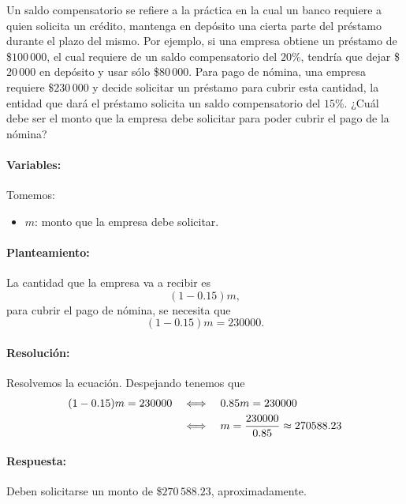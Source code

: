 \documentclass[10pt,respuestas,a4]{aleph-examen}
\begin{document}
\begin{preguntas}
\item
    Un saldo compensatorio se refiere a la práctica en la cual un banco requiere a quien solicita un crédito, mantenga en depósito una cierta parte del préstamo durante el plazo del mismo. Por ejemplo, si una empresa obtiene un préstamo de \$$100\,000$, el cual requiere de un saldo compensatorio del $20$\%, tendría que dejar \$$20\,000$ en depósito y usar sólo \$$80\,000$. Para pago de nómina, una empresa requiere \$$230\,000$ y decide solicitar un préstamo para cubrir esta cantidad, la entidad que dará el préstamo solicita un saldo compensatorio del $15$\%. ¿Cuál debe ser el monto que la empresa debe solicitar para poder cubrir el pago de la nómina?
    
\begin{respuesta}\hspace{0pt}
    \paragraph{Variables:} Tomemos:
    \begin{itemize}
        \item $m$: monto que la empresa debe solicitar.
    \end{itemize}
    \paragraph{Planteamiento:} La cantidad que la empresa va a recibir es
    \[
        (1 - 0.15)m,
    \]
    para cubrir el pago de nómina, se necesita que
    \[
        (1 - 0.15)m = 230000.
    \]
        
    \paragraph{Resolución:} Resolvemos la ecuación. Despejando tenemos que
    \begin{align*}
       (1 - 0.15)m = 230000
       &\quad\Longleftrightarrow\quad 0.85m = 230000 \\
       &\quad\Longleftrightarrow\quad m = \frac{230000}{0.85} \approx 270588.23
    \end{align*}
    
    \paragraph{Respuesta:} Deben solicitarse un monto de \$$270\,588.23$, aproximadamente.
\end{respuesta}


\end{preguntas}
\end{document}
